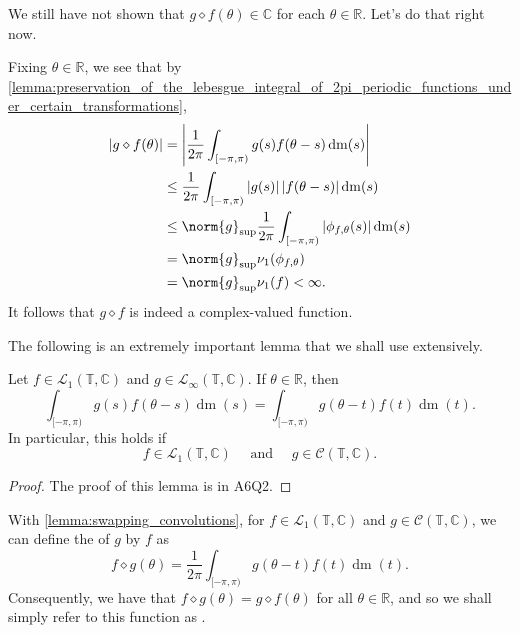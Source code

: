 \documentclass[notoc,notitlepage]{tufte-book}
\DeclareMathOperator{\dm}{dm}
\begin{document}
We still have not shown that $g \diamond f(\theta) \in \mathbb{C}$
for each $\theta \in \mathbb{R}$. Let's do that right now.

Fixing $\theta \in \mathbb{R}$, we see that
by
\cref{lemma:preservation_of_the_lebesgue_integral_of_2pi_periodic_functions_under_certain_transformations},
\begin{align*}
  \abs{g \diamond f(\theta)}
  &= \abs{ \frac{1}{2\pi} \int_{[-\pi, \pi)} g(s)f(\theta - s) \dm(s) } \\
  &\leq \frac{1}{2\pi} \int_{[-\pi, \pi)} \abs{g(s)} \abs{f(\theta - s)} \dm(s) \\
  &\leq \norm{g}_{\sup} \frac{1}{2\pi} \int_{[-\pi, \pi)}
      \abs{\phi_{f, \theta}(s)} \dm(s) \\
  &= \norm{g}_{\sup} \nu_1(\phi_{f, \theta}) \\
  &= \norm{g}_{\sup} \nu_1(f) < \infty.
\end{align*}
It follows that $g \diamond f$ is indeed a complex-valued function.

The following is an extremely important lemma that we shall use extensively.

\begin{lemma}\label{lemma:swapping_convolutions}
  Let $f \in \mathcal{L}_1(\mathbb{T}, \mathbb{C})$ and
  $g \in \mathcal{L}_\infty(\mathbb{T}, \mathbb{C})$.
  If $\theta \in \mathbb{R}$, then
  \begin{equation*}
    \int_{[-\pi, \pi)} g(s) f(\theta - s) \dm(s)
    = \int_{[-\pi, \pi)} g(\theta - t) f(t) \dm(t).
  \end{equation*}
  In particular, this holds if
  \begin{equation*}
    f \in \mathcal{L}_1(\mathbb{T}, \mathbb{C}) \quad \text{ and } \quad
    g \in \mathcal{C}(\mathbb{T}, \mathbb{C}).
  \end{equation*}
\end{lemma}

\begin{proof}
  The proof of this lemma is in A6Q2.
\end{proof}

\begin{remark}
  With \cref{lemma:swapping_convolutions},
  for $f \in \mathcal{L}_1(\mathbb{T}, \mathbb{C})$ and
  $g \in \mathcal{C}(\mathbb{T}, \mathbb{C})$,
  we can define the  of $g$ by $f$ as
  \begin{equation*}
    f \diamond g(\theta) = \frac{1}{2\pi} \int_{[-\pi, \pi)} g(\theta - t) f(t) \dm(t).
  \end{equation*}
  Consequently, we have that $f \diamond g(\theta) = g \diamond f(\theta)$
  for all $\theta \in \mathbb{R}$, and so we shall simply refer
  to this function as .
\end{remark}
\end{document}
